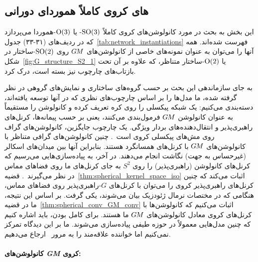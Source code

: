 

\subsection{های کروی کاملاً هموردای دورانی}
\label{sec:spherical_CNNs_fully_equivariant}


این بخش به بحث در مورد کانولوشن‌های کروی کاملاً $\operatorname{SO}(3)$- یا $\operatorname{O}(3)$-هموردا می‌پردازد که در ردیف‌های (۳۱-۳۳) جدول~\ref{tab:network_instantiations} فهرست شده‌اند.
همه آنها را می‌توان به عنوان نمونه‌های خاصی از کانولوشن‌های $G\mkern-1.4muM$ روی $\operatorname{SO}(2)$-ساختار در شکل~\ref{fig:G_structure_S2_1} یا $\operatorname{O}(2)$-ساختار متناظر، که علاوه بر آن تحت بازتاب‌های چارچوب نیز بسته است، درک کرد.

به جای سازماندهی این بحث بر حسب گروه‌های ساختاری و نمایش‌های گروهی در نظر گرفته شده، ما مدل‌ها را بر اساس چارچوب‌های نظری که در آنها توسعه یافته‌اند، دسته‌بندی می‌کنیم:
\citet{kicanaoglu2019gaugeSphere} یک شبکه پیکسلی را روی کره تعریف کرده و کانولوشن را مستقیماً به عنوان کانولوشن $G\mkern-1.4muM$ فرمول‌بندی می‌کنند، یعنی بر حسب پیمانه‌ها، کرنل‌های راهبری‌پذیر و انتقال‌دهنده‌های بردار ویژگی.
یک چارچوب جایگزین، کانولوشن‌های گراف روی مش‌های پیکسلی کروی است~\cite{perraudin2018DeepSphere,yang2020rotation}.
چنین کانولوشن‌های گرافی متناظر با کانولوشن‌های $G\mkern-1.4muM$ با کرنل‌های همسانگرد هستند.
بنابراین آنها بین میدان‌های اسکالر (غیرحساس به جهت) نگاشت انجام می‌دهند.
در آخر، به پیاده‌سازی‌هایی می‌رسیم که کرنل‌های کانولوشن (راهبری‌پذیر) را روی $S^2$ به جای کرنل‌های ما روی فضاهای مماس در نظر می‌گیرند~\cite{esteves2018zonalSpherical,Cohen2018-S2CNN,kondor2018ClebschGordan,esteves2020spinweighted}.
قضیه~\ref{thm:spherical_kernel_space_iso} اثبات می‌کند که چنین کرنل‌های راهبری‌پذیر کروی را می‌توان با کرنل‌های $G$-راهبری‌پذیر روی فضاهای مماس، هنگامی که در مختصات نرمال ژئودزیک بیان می‌شوند، یکی گرفت.
بر اساس این نتیجه، ما در قضیه~\ref{thm:spherical_conv_GM_conv} اثبات می‌کنیم که کانولوشن‌ها با کرنل‌های کروی معادل کانولوشن‌های $G\mkern-1.4muM$ ما هستند.
برای کامل بودن، باید اشاره کنیم که چنین مدل‌هایی معمولاً در حوزه طیفی پیاده‌سازی می‌شوند.
ما بر این دیدگاه تمرکز نمی‌کنیم اما خواننده علاقه‌مند را به مرور~\citet{esteves2020theoretical} ارجاع می‌دهیم.


\paragraph{کانولوشن‌های \textit{GM} کروی:}

